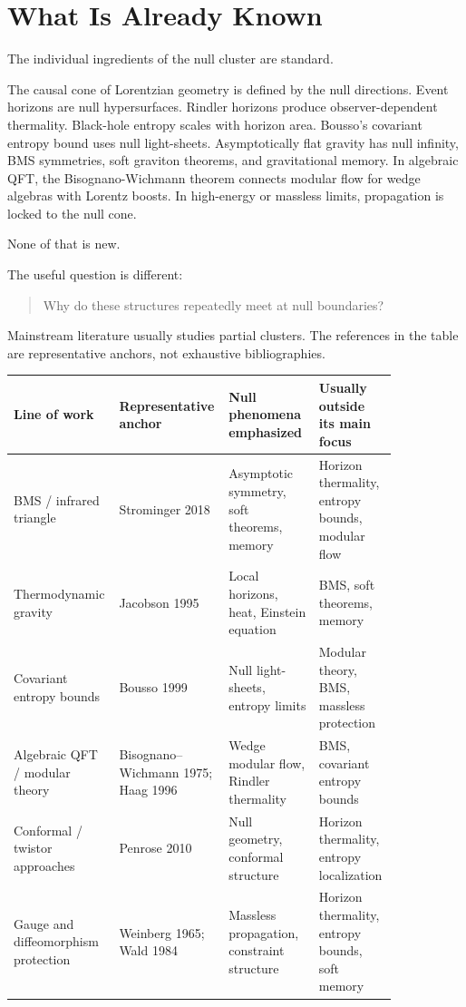 \documentclass[12pt,a4paper]{article}
\theoremstyle{definition}
\theoremstyle{remark}
\begin{document}
\section{What Is Already Known}\label{what-is-already-known}

The individual ingredients of the null cluster are standard.

The causal cone of Lorentzian geometry is defined by the null
directions. Event horizons are null hypersurfaces. Rindler horizons
produce observer-dependent thermality. Black-hole entropy scales with
horizon area. Bousso's covariant entropy bound uses null light-sheets.
Asymptotically flat gravity has null infinity, BMS symmetries, soft
graviton theorems, and gravitational memory. In algebraic QFT, the
Bisognano-Wichmann theorem connects modular flow for wedge algebras with
Lorentz boosts. In high-energy or massless limits, propagation is locked
to the null cone.

None of that is new.

The useful question is different:

\begin{quote}
Why do these structures repeatedly meet at null boundaries?
\end{quote}

Mainstream literature usually studies partial clusters. The references
in the table are representative anchors, not exhaustive bibliographies.

\begin{center}
\begin{tabular}{P{0.21\linewidth}P{0.20\linewidth}P{0.23\linewidth}P{0.20\linewidth}}
\toprule
\textbf{Line of work} & \textbf{Representative anchor} & \textbf{Null phenomena emphasized} & \textbf{Usually outside its main focus} \\
\midrule
BMS / infrared triangle & Strominger 2018 & Asymptotic symmetry, soft theorems, memory & Horizon thermality, entropy bounds, modular flow \\
Thermodynamic gravity & Jacobson 1995 & Local horizons, heat, Einstein equation & BMS, soft theorems, memory \\
Covariant entropy bounds & Bousso 1999 & Null light-sheets, entropy limits & Modular theory, BMS, massless protection \\
Algebraic QFT / modular theory & Bisognano--Wichmann 1975; Haag 1996 & Wedge modular flow, Rindler thermality & BMS, covariant entropy bounds \\
Conformal / twistor approaches & Penrose 2010 & Null geometry, conformal structure & Horizon thermality, entropy localization \\
Gauge and diffeomorphism protection & Weinberg 1965; Wald 1984 & Massless propagation, constraint structure & Horizon thermality, entropy bounds, soft memory \\
\bottomrule
\end{tabular}
\end{center}
\end{document}
